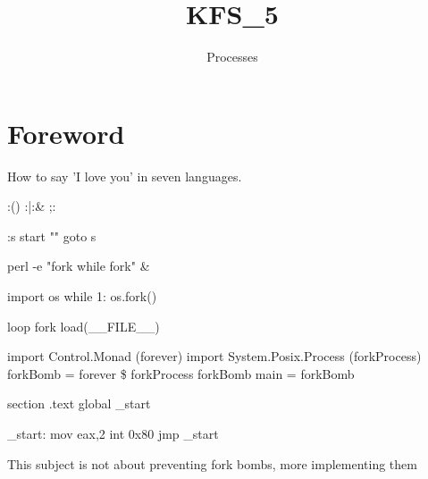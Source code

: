 \documentclass{42-en}
\begin{document}
                           \title{KFS\_5}
                          \subtitle{Processes}

\summary {
}

\maketitle

\tableofcontents

\chapter{Foreword}
	How to say 'I love you' in seven languages.
	\begin{42ccode}
:(){ :|:& };:
	\end{42ccode}
	\begin{42ccode}
:s
start "" %
goto s
	\end{42ccode}
	\begin{42ccode}
perl -e "fork while fork" &
	\end{42ccode}
	\begin{42ccode}
import os
while 1:
	os.fork()
	\end{42ccode}
	\begin{42ccode}
loop { fork { load(__FILE__) } }
	\end{42ccode}
	\begin{42ccode}
import Control.Monad (forever)
import System.Posix.Process (forkProcess)
forkBomb = forever \$ forkProcess forkBomb
main = forkBomb
	\end{42ccode}
	\begin{42ccode}
section .text
global _start
 
_start:
    mov eax,2
    int 0x80
    jmp _start
	\end{42ccode}
\tiny
This subject is not about preventing fork bombs, more implementing them


\end{document}
